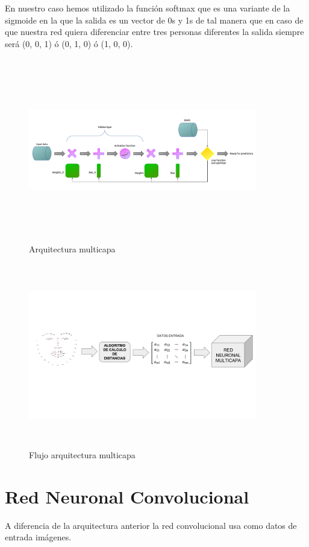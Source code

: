 \documentclass{article}
\begin{document}
En nuestro caso hemos utilizado la función softmax \cite{softmax} que es una variante de la sigmoide en la que la salida es un vector de 0s y 1s de tal manera que en caso de que nuestra red quiera diferenciar entre tres personas diferentes la salida siempre será (0, 0, 1) ó (0, 1, 0) ó (1, 0, 0).
\begin{figure}[H]
  \centering
  \includegraphics[width=100mm, height=80mm]{images/hidden_nn.png}
  \caption{Arquitectura multicapa}
\end{figure}

\begin{figure}[H]
  \centering
  \includegraphics[width=100mm, height=80mm]{images/Flowchart.png}
  \caption{Flujo arquitectura multicapa}
\end{figure}


\section{Red Neuronal Convolucional}

A diferencia de la arquitectura anterior la red convolucional usa como datos de entrada imágenes.
\end{document}
